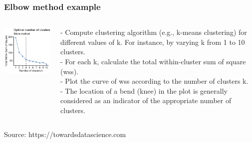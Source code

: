 \documentclass{beamer}
\begin{document}
\begin{frame}
\frametitle{Elbow method example}




\begin{columns}
	\begin{column}{.55\textwidth}
	\begin{center}
		\includegraphics[width=50mm]{elbow2.png} 
	\end{center}
		
	\end{column}
	\begin{column}{.55\textwidth}
		
-	Compute clustering algorithm (e.g., k-means clustering) for different values of k. For instance, by varying k from 1 to 10 clusters. \\
-	For each k, calculate the total within-cluster sum of square (wss).\\
-	Plot the curve of wss according to the number of clusters k.\\
-	The location of a bend (knee) in the plot is generally considered as an indicator of the appropriate number of clusters.\\


\end{column}

\end{columns}
{\tiny Source: https://towardsdatascience.com}

\end{frame}
\end{document}

